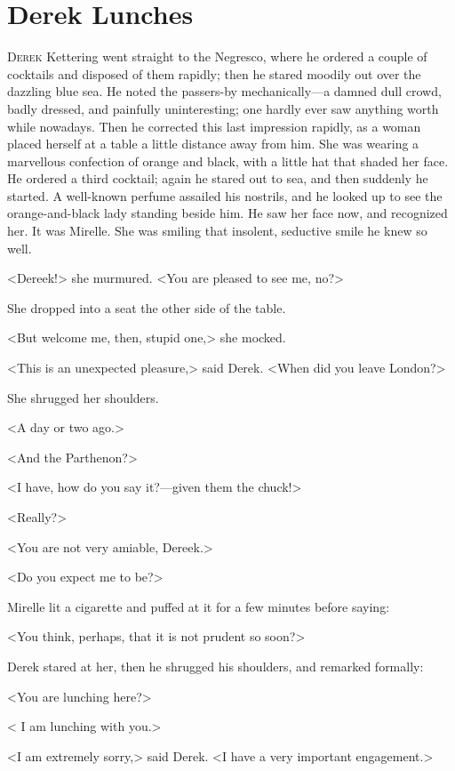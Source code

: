 \chapter{Derek Lunches}



\lettrine{D}{erek} Kettering went straight to the Negresco, where he ordered a couple of cocktails and disposed of them rapidly; then he stared moodily out over the dazzling blue sea. He noted the passers-by mechanically—a damned dull crowd, badly dressed, and painfully uninteresting; one hardly ever saw anything worth while nowadays. Then he corrected this last impression rapidly, as a woman placed herself at a table a little distance away from him. She was wearing a marvellous confection of orange and black, with a little hat that shaded her face. He ordered a third cocktail; again he stared out to sea, and then suddenly he started. A well-known perfume assailed his nostrils, and he looked up to see the orange-and-black lady standing beside him. He saw her face now, and recognized her. It was Mirelle. She was smiling that insolent, seductive smile he knew so well.

<Dereek!> she murmured. <You are pleased to see me, no?>

She dropped into a seat the other side of the table.

<But welcome me, then, stupid one,> she mocked.

<This is an unexpected pleasure,> said Derek. <When did you leave London?>

She shrugged her shoulders.

<A day or two ago.>

<And the Parthenon?>

<I have, how do you say it?—given them the chuck!>

<Really?>

<You are not very amiable, Dereek.>

<Do you expect me to be?>

Mirelle lit a cigarette and puffed at it for a few minutes before saying:

<You think, perhaps, that it is not prudent so soon?>

Derek stared at her, then he shrugged his shoulders, and remarked formally:

<You are lunching here?>

< I am lunching with you.>

<I am extremely sorry,> said Derek. <I have a very important engagement.>

